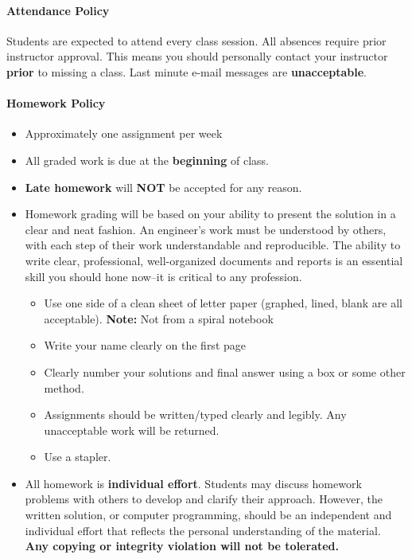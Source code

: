 \documentclass[11pt, reqno]{article}   	%
\begin{document}
\paragraph{Attendance Policy} 
Students are expected to attend every class session.
All absences require prior instructor approval.
This means you should personally contact your instructor \textbf{prior} to missing a class.
Last minute e-mail messages are \textbf{unacceptable}.

\paragraph{Homework Policy}

\begin{itemize}
    \item Approximately one assignment per week
    \item All graded work is due at the \textbf{beginning} of class.
    \item \textbf{Late homework} will \textbf{NOT} be accepted for any reason.
    \item Homework grading will be based on your ability to present the solution in a clear and neat fashion.
    An engineer's work must be understood by others, with each step of their work understandable and reproducible. 
    The ability to write clear, professional, well-organized documents and reports is an essential skill you should hone now--it is critical to any profession.
    \begin{itemize}
        \item Use one side of a clean sheet of letter paper (graphed, lined, blank are all acceptable).
        \textbf{Note:} Not from a spiral notebook
        \item Write your name clearly on the first page
        \item Clearly number your solutions and final answer using a box or some other method.
        \item Assignments should be written/typed clearly and legibly. 
        Any unacceptable work will be returned.
        \item Use a stapler.
    \end{itemize}
    \item All homework is \textbf{individual effort}.
    Students may discuss homework problems with others to develop and clarify their approach.
    However, the written solution, or computer programming, should be an independent and individual effort that reflects the personal understanding of the material.
    \textbf{Any copying or integrity violation will not be tolerated.}
\end{itemize}
\end{document}
